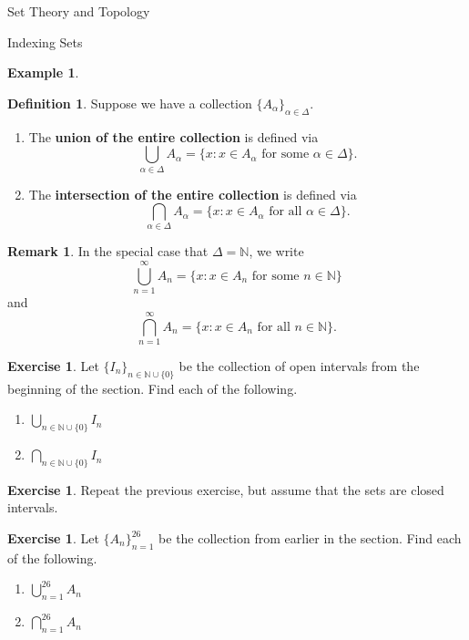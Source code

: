 \documentclass[11pt]{article}
\theoremstyle{definition}
\newtheorem{definition}[theorem]{Definition}
\newtheorem{example}[theorem]{Example}
\newtheorem{exercise}[theorem]{Exercise}
\newtheorem{remark}[theorem]{Remark}
\begin{document}
\begin{section}{Set Theory and Topology}
\begin{subsection}{Indexing Sets}
\begin{example}
\begin{enumerate}
\end{enumerate}
\end{example}

\begin{definition}
Suppose we have a collection $\{A_{\alpha}\}_{\alpha\in\Delta}$.

\begin{enumerate}
\item The \textbf{union of the entire collection} is defined via
\[
\bigcup_{\alpha\in\Delta} A_{\alpha}=\{x:x\in A_{\alpha} \mbox{ for some }\alpha\in \Delta\}.
\]

\item The \textbf{intersection of the entire collection} is defined via
\[
\bigcap_{\alpha\in\Delta} A_{\alpha}=\{x:x\in A_{\alpha} \mbox{ for all }\alpha\in \Delta\}.
\]

\end{enumerate}
\end{definition}

\begin{remark} 
In the special case that $\Delta=\mathbb{N}$, we write
\[
\bigcup_{n=1}^{\infty}A_n= \{ x : x \in A_n \mbox{ for some } n \in \mathbb{N}\}
\] 
and
\[
\bigcap_{n=1}^{\infty}A_n= \{ x : x \in A_n \mbox{ for all } n \in \mathbb{N}\}.
\] 
\end{remark}

\begin{exercise}
Let $\{I_n\}_{n\in\mathbb{N}\cup\{0\}}$ be the collection of open intervals from the beginning of the section.  Find each of the following.
\begin{enumerate}
\item $\displaystyle \bigcup_{n\in\mathbb{N}\cup\{0\}}I_n$
\item $\displaystyle \bigcap_{n\in\mathbb{N}\cup\{0\}}I_n$
\end{enumerate}
\end{exercise}

\begin{exercise}
Repeat the previous exercise, but assume that the sets are closed intervals.
\end{exercise}

\begin{exercise}
Let $\{A_n\}_{n=1}^{26}$ be the collection from earlier in the section.  Find each of the following.
\begin{enumerate}
\item $\displaystyle \bigcup_{n=1}^{26}A_n$
\item $\displaystyle \bigcap_{n=1}^{26}A_n$
\end{enumerate}
\end{exercise}


\end{subsection}
\end{section}
\end{document}
